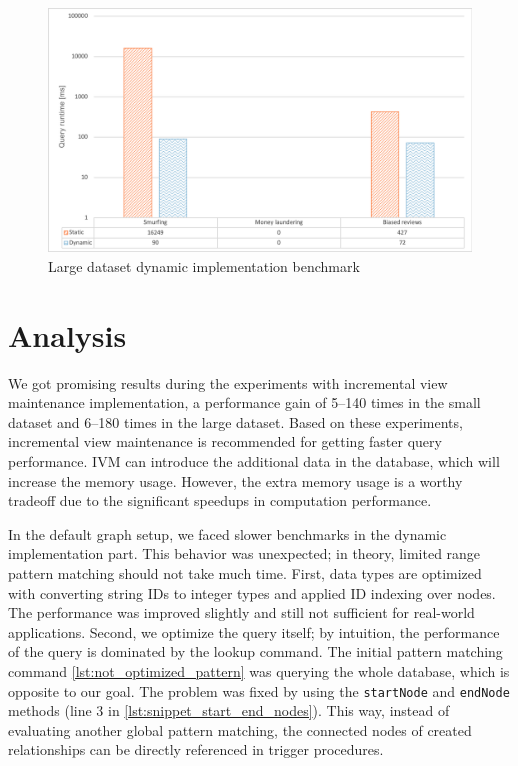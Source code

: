 \begin{figure}[!ht]
  \centering
  \includegraphics[width=\textwidth]{figures/dynamic_benchmark_plot_large.png}
  \caption{Large dataset dynamic implementation benchmark} 
  \label{fig:benchmark_large}
\end{figure}

\section{Analysis}

We got promising results during the experiments with incremental view maintenance implementation, a performance gain of 5--140 times in the small dataset and 6--180 times in the large dataset.
Based on these experiments, incremental view maintenance is recommended for getting faster query performance.
IVM can introduce the additional data in the database, which will increase the memory usage.
However, the extra memory usage is a worthy tradeoff due to the significant speedups in computation performance.

In the default graph setup, we faced slower benchmarks in the dynamic implementation part.
This behavior was unexpected; in theory, limited range pattern matching should not take much time.
First, data types are optimized with converting string IDs to integer types and applied ID indexing over nodes.
The performance was improved slightly and still not sufficient for real-world applications.
Second, we optimize the query itself; by intuition, the performance of the query is dominated by the lookup command.
The initial pattern matching command \autoref{lst:not_optimized_pattern} was querying the whole database, which is opposite to our goal. 
The problem was fixed by using the \texttt{startNode} and \texttt{endNode} methods (line 3 in \autoref{lst:snippet_start_end_nodes}).
This way, instead of evaluating another global pattern matching, the connected nodes of created relationships can be directly referenced in trigger procedures.

